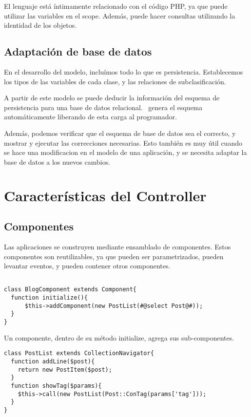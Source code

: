 El lenguaje está íntimamente relacionado con el código PHP, ya que puede utilizar las variables en el scope. Además, puede hacer consultas utilizando la identidad de los objetos.

\subsection{Adaptación de base de datos}
\label{sub-adapt}
En el desarrollo del modelo, incluímos todo lo que es persistencia. Establecemos los tipos de las variables de cada clase, y las relaciones de subclasificación.

A partir de este modelo se puede deducir la información del esquema de persistencia para una base de datos relacional. \PWB \ genera el esquema automáticamente liberando de esta carga al programador.

Además, podemos verificar que el esquema de base de datos sea el correcto, y mostrar y ejecutar las correcciones necesarias. Esto también es muy útil cuando se hace una modificacion en el modelo de una aplicación, y se necesita adaptar la base de datos a los nuevos cambios.

\section{Características del Controller}
\subsection{Componentes}
\label{sub-comp}

Las aplicaciones se construyen mediante ensamblado de componentes. Estos componentes son reutilizables,
ya que pueden ser parametrizados, pueden levantar eventos, y pueden contener otros componentes.

\begin{verbatim}

class BlogComponent extends Component{
  function initialize(){
      $this->addComponent(new PostList(#@select Post@#));
  }
}
\end{verbatim}
Un componente, dentro de su método initialize, agrega sus sub-componentes.

\begin{verbatim}
class PostList extends CollectionNavigator{
  function addLine($post){
    return new PostItem($post);
  }
  function showTag($params){
    $this->call(new PostList(Post::ConTag(params['tag']));
  }
}

\end{verbatim}

